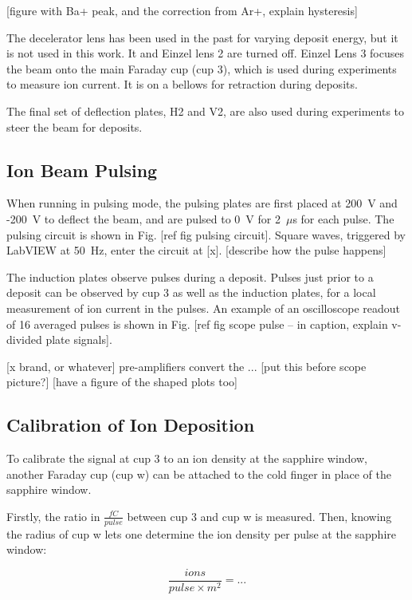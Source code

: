 [figure with Ba+ peak, and the correction from Ar+, explain hysteresis]

The decelerator lens has been used in the past for varying deposit energy, but it is not used in this work.  It and Einzel lens 2 are turned off.  Einzel Lens 3 focuses the beam onto the main Faraday cup (cup 3), which is used during experiments to measure ion current.  It is on a bellows for retraction during deposits.

The final set of deflection plates, H2 and V2, are also used during experiments to steer the beam for deposits.

\subsection{Ion Beam Pulsing}

When running in pulsing mode, the pulsing plates are first placed at 200~V and -200~V to deflect the beam, and are pulsed to 0~V for {\color{red}2~$\mu$s} for each pulse.  The pulsing circuit is shown in Fig. [ref fig pulsing circuit].  Square waves, triggered by LabVIEW at {\color{red}50~Hz}, enter the circuit at [x]. {\color{red}[describe how the pulse happens]}

The induction plates observe pulses during a deposit.  Pulses just prior to a deposit can be observed by cup 3 as well as the induction plates, for a local measurement of ion current in the pulses.  An example of an oscilloscope readout of {\color{red}16} averaged pulses is shown in Fig. [ref fig scope pulse -- in caption, explain v-divided plate signals].  

[x brand, or whatever] pre-amplifiers convert the ... [put this before scope picture?] [have a figure of the shaped plots too]

\subsection{Calibration of Ion Deposition}

To calibrate the signal at cup 3 to an ion density at the sapphire window, another Faraday cup (cup w) can be attached to the cold finger in place of the sapphire window.  

Firstly, the ratio in $\frac{fC}{pulse}$ between cup 3 and cup w is measured.  Then, knowing the radius of cup w lets one determine the ion density per pulse at the sapphire window:

\begin{equation}
\frac{ions}{pulse \times m^{2}} = ...
\label{eqn:ion_density}
\end{equation}

